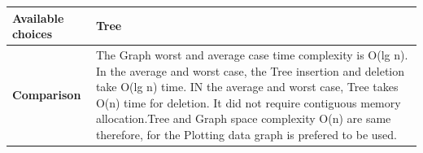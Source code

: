 \documentclass[12pt,a4paper]{report}
\begin{document}
\begin{center}
\begin{tabular}{ | m{4cm}|m{12cm}| }
 \\ \hline
\textbf{Available choices}& Tree \\ \hline
\textbf{Comparison}&
The Graph worst and average case time complexity is O(lg n). In the average and worst case, the Tree insertion and deletion take O(lg n) time. IN the average and worst case, Tree takes O(n) time for deletion. It did not require contiguous memory allocation.Tree and Graph space complexity O(n) are  same therefore, for the Plotting  data graph is prefered to be used.
 \\ \hline
\end{tabular}

\end{center}
\end{document}
